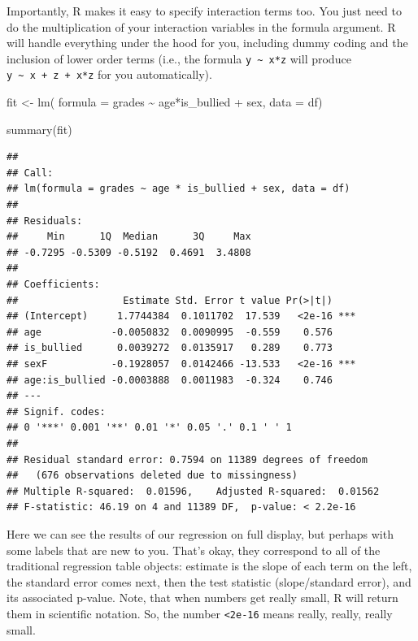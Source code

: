 \documentclass[
]{book}
\newenvironment{Shaded}{\begin{snugshade}}{\end{snugshade}}
\newcommand{\AttributeTok}[1]{\textcolor[rgb]{0.77,0.63,0.00}{#1}}
\newcommand{\FunctionTok}[1]{\textcolor[rgb]{0.00,0.00,0.00}{#1}}
\newcommand{\NormalTok}[1]{#1}
\newcommand{\OtherTok}[1]{\textcolor[rgb]{0.56,0.35,0.01}{#1}}
\newcommand{\SpecialCharTok}[1]{\textcolor[rgb]{0.00,0.00,0.00}{#1}}
\begin{document}
Importantly, R makes it easy to specify interaction terms too. You just need to do the multiplication of your interaction variables in the formula argument. R will handle everything under the hood for you, including dummy coding and the inclusion of lower order terms (i.e., the formula \texttt{y\ \textasciitilde{}\ x*z} will produce \texttt{y\ \textasciitilde{}\ x\ +\ z\ +\ x*z} for you automatically).

\begin{Shaded}
\begin{Highlighting}[]
\NormalTok{fit }\OtherTok{\textless{}{-}} \FunctionTok{lm}\NormalTok{(}
  \AttributeTok{formula =}\NormalTok{ grades }\SpecialCharTok{\textasciitilde{}}\NormalTok{ age}\SpecialCharTok{*}\NormalTok{is\_bullied }\SpecialCharTok{+}\NormalTok{ sex,}
  \AttributeTok{data =}\NormalTok{ df)}

\FunctionTok{summary}\NormalTok{(fit)}
\end{Highlighting}
\end{Shaded}

\begin{verbatim}
## 
## Call:
## lm(formula = grades ~ age * is_bullied + sex, data = df)
## 
## Residuals:
##     Min      1Q  Median      3Q     Max 
## -0.7295 -0.5309 -0.5192  0.4691  3.4808 
## 
## Coefficients:
##                  Estimate Std. Error t value Pr(>|t|)    
## (Intercept)     1.7744384  0.1011702  17.539   <2e-16 ***
## age            -0.0050832  0.0090995  -0.559    0.576    
## is_bullied      0.0039272  0.0135917   0.289    0.773    
## sexF           -0.1928057  0.0142466 -13.533   <2e-16 ***
## age:is_bullied -0.0003888  0.0011983  -0.324    0.746    
## ---
## Signif. codes:  
## 0 '***' 0.001 '**' 0.01 '*' 0.05 '.' 0.1 ' ' 1
## 
## Residual standard error: 0.7594 on 11389 degrees of freedom
##   (676 observations deleted due to missingness)
## Multiple R-squared:  0.01596,    Adjusted R-squared:  0.01562 
## F-statistic: 46.19 on 4 and 11389 DF,  p-value: < 2.2e-16
\end{verbatim}

Here we can see the results of our regression on full display, but perhaps with some labels that are new to you. That's okay, they correspond to all of the traditional regression table objects: estimate is the slope of each term on the left, the standard error comes next, then the test statistic (slope/standard error), and its associated p-value. Note, that when numbers get really small, R will return them in scientific notation. So, the number \texttt{\textless{}2e-16} means really, really, really small.
\end{document}
